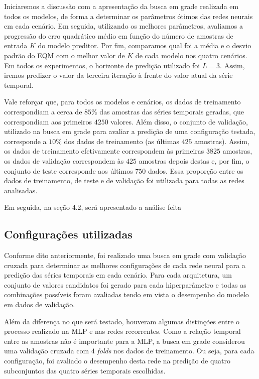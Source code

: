 \documentclass[a4paper, 12pt]{article}
\begin{document}
Iniciaremos a discussão com a apresentação da busca em grade realizada em todos os modelos, de forma a determinar os parâmetros ótimos das redes neurais em cada cenário. Em seguida, utilizando os melhores parâmetros, avaliamos a progressão do erro quadrático médio em função do número de amostras de entrada $K$ do modelo preditor. Por fim, comparamos qual foi a média e o desvio padrão do EQM com o melhor valor de $K$ de cada modelo nos quatro cenários. Em todos os experimentos, o horizonte de predição utilizado foi $L=3$. Assim, iremos predizer o valor da terceira iteração à frente do valor atual da série temporal.

Vale reforçar que, para todos os modelos e cenários, os dados de treinamento correspondiam a cerca de $85\%$ das amostras das séries temporais geradas, que correspondiam aos primeiros $4250$ valores. Além disso, o conjunto de validação, utilizado na busca em grade para avaliar a predição de uma configuração testada, corresponde a $10\%$ dos dados de treinamento (as últimas $425$ amostras). Assim, os dados de treinamento efetivamente correspondem às primeiras $3825$ amostras, os dados de validação correspondem às $425$ amostras depois destas e, por fim, o conjunto de teste corresponde aos últimos $750$ dados. Essa proporção entre os dados de treinamento, de teste e de validação foi utilizada para todas as redes analisadas.

Em seguida, na seção 4.2, será apresentado a análise feita 

\subsection{Configurações utilizadas}

Conforme dito anteriormente, foi realizado uma busca em grade com validação cruzada para determinar as melhores configurações de cada rede neural para a predição das séries temporais em cada cenário. Para cada arquitetura, um conjunto de valores candidatos foi gerado para cada hiperparâmetro e todas as combinações possíveis foram avaliadas tendo em vista o desempenho do modelo em dados de validação.

Além da diferença no que será testado, houveram algumas distinções entre o processo realizado na MLP e nas redes recorrentes. Como a relação temporal entre as amostras não é importante para a MLP, a busca em grade considerou uma validação cruzada com $4$ \textit{folds} nos dados de treinamento. Ou seja, para cada configuração, foi avaliado o desempenho desta rede na predição de quatro subconjuntos das quatro séries temporais escolhidas.
\end{document}
